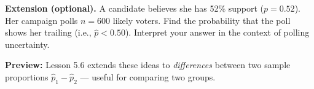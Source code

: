 \documentclass[10pt]{article}
\begin{document}
\begin{extensionbox}
\textbf{Extension (optional).}
A candidate believes she has 52\% support ($p = 0.52$). Her campaign polls $n = 600$
likely voters. Find the probability that the poll shows her trailing (i.e., $\hat{p} < 0.50$).
Interpret your answer in the context of polling uncertainty.
\end{extensionbox}

\begin{reflectionbox}
\textbf{Preview:} Lesson 5.6 extends these ideas to \emph{differences} between two sample
proportions $\hat{p}_1 - \hat{p}_2$ --- useful for comparing two groups.
\end{reflectionbox}
\end{document}
